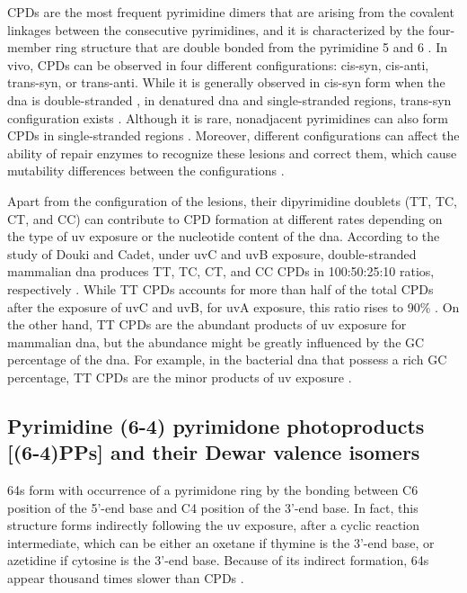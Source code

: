 \gls{CPD}s are the most frequent pyrimidine dimers that are arising from the covalent linkages between the consecutive pyrimidines, and it is characterized by the four-member ring structure that are double bonded from the pyrimidine 5 and 6 \citep{whitmore2001effect}. In vivo, \gls{CPD}s can be observed in four different configurations: cis-syn, cis-anti, trans-syn, or trans-anti. \citep{khattak1972photochemical} While it is generally observed in cis-syn form when the \gls{dna} is double-stranded \citep{wacker1964organic}, in denatured \gls{dna} and single-stranded regions, trans-syn configuration exists \citep{taylor1988synthesis}. Although it is rare, nonadjacent pyrimidines can also form \gls{CPD}s in single-stranded regions \citep{nguyen1988ultraviolet}. Moreover, different configurations can affect the ability of repair enzymes to recognize these lesions and correct them, which cause mutability differences between the configurations \citep{friedberg2005dna}. 

Apart from the configuration of the lesions, their dipyrimidine doublets (\gls{T}\gls{T}, \gls{T}\gls{C}, \gls{C}\gls{T}, and \gls{C}\gls{C}) can contribute to \gls{CPD} formation at different rates depending on the type of \gls{uv} exposure or the nucleotide content of the \gls{dna}. According to the study of Douki and Cadet, under \gls{uv}C and \gls{uv}B exposure, double-stranded mammalian \gls{dna} produces \gls{T}\gls{T}, \gls{T}\gls{C}, \gls{C}\gls{T}, and \gls{C}\gls{C} \gls{CPD}s in 100:50:25:10 ratios, respectively \citep{douki2001individual}. While \gls{T}\gls{T} \gls{CPD}s accounts for more than half of the total \gls{CPD}s after the exposure of \gls{uv}C and \gls{uv}B, for \gls{uv}A exposure, this ratio rises to 90\% \citep{mouret2010uva}. On the other hand, \gls{T}\gls{T} \gls{CPD}s are the abundant products of \gls{uv} exposure for mammalian \gls{dna}, but the abundance might be greatly influenced by the \gls{G}\gls{C} percentage of the \gls{dna}. For example, in the bacterial \gls{dna} that possess a rich \gls{G}\gls{C} percentage, \gls{T}\gls{T} \gls{CPD}s are the minor products of \gls{uv} exposure \citep{patrick1977studies}.

\subsection{Pyrimidine (6-4) pyrimidone photoproducts [(6-4)PPs] and their Dewar valence isomers}

\gls{64}s form with occurrence of a pyrimidone ring by the bonding between C6 position of the 5’-end base and C4 position of the 3’-end base. In fact, this structure forms indirectly following the \gls{uv} exposure, after a cyclic reaction intermediate, which can be either an oxetane if thymine is the 3’-end base, or azetidine if cytosine is the 3’-end base. Because of its indirect formation, \gls{64}s appear thousand times slower than \gls{CPD}s \citep{schreier2007thymine}. 

